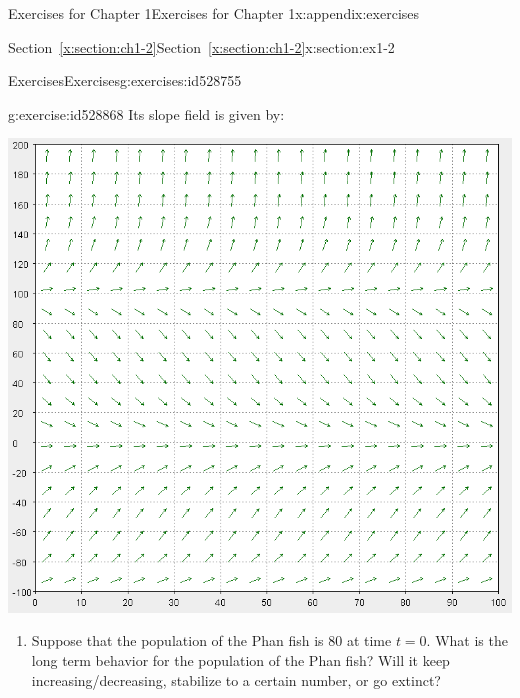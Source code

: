 \documentclass[oneside,10pt,]{book}
\newcommand{\xreffont}{\relax}
\numberwithin{equation}{section}
\numberwithin{equation}{section}
\begin{document}
\begin{appendixptx}{Exercises for Chapter 1}{}{Exercises for Chapter 1}{}{}{x:appendix:exercises}
\begin{sectionptx}{Section~{\xreffont\ref*{x:section:ch1-2}}}{}{Section~{\xreffont\ref*{x:section:ch1-2}}}{}{}{x:section:ex1-2}
\begin{exercises-subsection-numberless}{Exercises}{}{Exercises}{}{}{g:exercises:id528755}
\begin{divisionexercise}{4}{}{}{g:exercise:id528868}
Its slope field is given by:%
\begin{image}{0}{1}{0}%
\includegraphics[width=\linewidth]{images/HWc1s2-3b.png}
\end{image}%
%
\begin{enumerate}[label=(\alph*)]
\item{}Suppose that the population of the Phan fish is \(80\) at time \(t=0\). What is the long term behavior for the population of the Phan fish? Will it keep increasing\slash{}decreasing, stabilize to a certain number, or go extinct?%
\end{enumerate}
\end{divisionexercise}%
\end{exercises-subsection-numberless}
\end{sectionptx}
\end{appendixptx}
%
%
\typeout{************************************************}
\typeout{************************************************}
%
\end{document}
